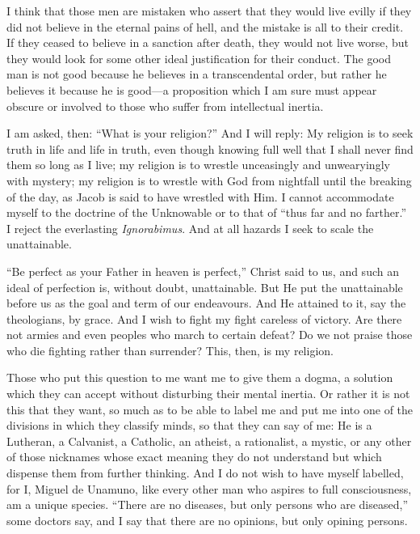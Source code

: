 I think that those men are mistaken who assert that they would live
evilly if they did not believe in the eternal pains of hell, and the
mistake is all to their credit. If they ceased to believe in a
sanction after death, they would not live worse, but they would look
for some other ideal justification for their conduct. The good man is
not good because he believes in a transcendental order, but rather he
believes it because he is good---a proposition which I am sure must
appear obscure or involved to those who suffer from intellectual
inertia.

I am asked, then: ``What is your religion?'' And  I will
reply: My religion is to seek truth in life and life in truth, even
though knowing full well that I shall never find them so long as I
live; my religion is to wrestle unceasingly and unwearyingly with
mystery; my religion is to wrestle with God from nightfall until the
breaking of the day, as Jacob is said to have wrestled with Him. I
cannot accommodate myself to the doctrine of the Unknowable or to that
of ``thus far and no farther.'' I reject the everlasting
\textit{Ignorabimus}. And at all hazards I seek to scale the
unattainable.

``Be perfect as your Father in heaven is perfect,'' Christ said to us,
and such an ideal of perfection is, without doubt, unattainable. But
He put the unattainable before us as the goal and term of our
endeavours. And He attained to it, say the theologians, by grace. And
I wish to fight my fight careless of victory. Are there not armies and
even peoples who march to certain defeat? Do we not praise those who
die fighting rather than surrender? This, then, is my religion.

Those who put this question to me want me to give them a dogma, a
solution which they can accept without disturbing their mental
inertia. Or rather it is not this that they want, so much as to be
able to label me and put me into one of the divisions in which they
classify minds, so that they can say of me: He is a Lutheran, a
Calvanist, a Catholic, an atheist, a rationalist, a mystic, or any
other of those nicknames whose exact meaning they do not understand
but which dispense them from further thinking. And I do not wish to
have myself labelled, for I, Miguel de Unamuno, like every other man
who aspires to full consciousness, am a unique species. ``There are no
diseases, but only  persons who are diseased,'' some doctors
say, and I say that there are no opinions, but only opining persons.

